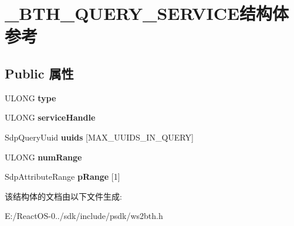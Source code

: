 \hypertarget{struct___b_t_h___q_u_e_r_y___s_e_r_v_i_c_e}{}\section{\+\_\+\+B\+T\+H\+\_\+\+Q\+U\+E\+R\+Y\+\_\+\+S\+E\+R\+V\+I\+C\+E结构体 参考}
\label{struct___b_t_h___q_u_e_r_y___s_e_r_v_i_c_e}
\subsection*{Public 属性}
\begin{DoxyCompactItemize}
\item 
\mbox{\label{struct___b_t_h___q_u_e_r_y___s_e_r_v_i_c_e_afb288296217de97faffe74418f03af56}} 
U\+L\+O\+NG {\bfseries type}
\item 
\mbox{\label{struct___b_t_h___q_u_e_r_y___s_e_r_v_i_c_e_a3b67c0e7f7efc705e6ed37a5cde4f681}} 
U\+L\+O\+NG {\bfseries service\+Handle}
\item 
\mbox{\label{struct___b_t_h___q_u_e_r_y___s_e_r_v_i_c_e_aa58fa856d94a6bf643b297347a85a798}} 
Sdp\+Query\+Uuid {\bfseries uuids} \mbox{[}M\+A\+X\+\_\+\+U\+U\+I\+D\+S\+\_\+\+I\+N\+\_\+\+Q\+U\+E\+RY\mbox{]}
\item 
\mbox{\label{struct___b_t_h___q_u_e_r_y___s_e_r_v_i_c_e_a477495d9a06a78231326c31958f68b35}} 
U\+L\+O\+NG {\bfseries num\+Range}
\item 
\mbox{\label{struct___b_t_h___q_u_e_r_y___s_e_r_v_i_c_e_a954fd795c36e01b2d79f29b8c744af02}} 
Sdp\+Attribute\+Range {\bfseries p\+Range} \mbox{[}1\mbox{]}
\end{DoxyCompactItemize}


该结构体的文档由以下文件生成\+:\begin{DoxyCompactItemize}
\item 
E\+:/\+React\+O\+S-\/0../sdk/include/psdk/ws2bth.\+h\end{DoxyCompactItemize}

